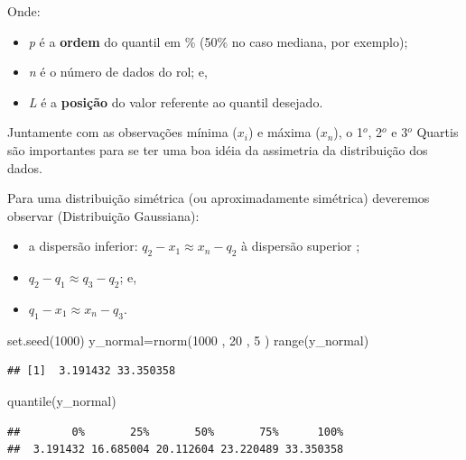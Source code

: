 \documentclass[
]{book}
\newenvironment{Shaded}{\begin{snugshade}}{\end{snugshade}}
\newcommand{\DecValTok}[1]{\textcolor[rgb]{0.00,0.00,0.81}{#1}}
\newcommand{\FunctionTok}[1]{\textcolor[rgb]{0.00,0.00,0.00}{#1}}
\newcommand{\NormalTok}[1]{#1}
\newcommand{\OtherTok}[1]{\textcolor[rgb]{0.56,0.35,0.01}{#1}}
\providecommand{\tightlist}{%
  \setlength{\itemsep}{0pt}\setlength{\parskip}{0pt}}
\begin{document}
Onde:

\begin{itemize}
\tightlist
\item
  \emph{p} é a \textbf{ordem} do quantil em \% (50\% no caso mediana, por exemplo);
\item
  \emph{n} é o número de dados do rol; e,
\item
  \emph{L} é a \textbf{posição} do valor referente ao quantil desejado.
\end{itemize}

Juntamente com as observações mínima (\(x_{i}\)) e máxima (\(x_{n}\)), o 1\(^{o}\), 2\(^{o}\) e 3\(^{o}\) Quartis são importantes para se ter uma boa idéia da assimetria da distribuição dos dados.

Para uma distribuição simétrica (ou aproximadamente simétrica) deveremos observar (Distribuição Gaussiana):

\begin{itemize}
\tightlist
\item
  a dispersão inferior: \(q_{2} - x_{1} \approx x_{n} - q_{2}\) à dispersão superior ;
\item
  \(q_{2} - q_{1} \approx q_{3} - q_{2}\); e,
\item
  \(q_{1} - x_{1} \approx x_{n} - q_{3}\).
\end{itemize}

\begin{Shaded}
\begin{Highlighting}[]
\FunctionTok{set.seed}\NormalTok{(}\DecValTok{1000}\NormalTok{)}
\NormalTok{y\_normal}\OtherTok{=}\FunctionTok{rnorm}\NormalTok{(}\DecValTok{1000}\NormalTok{ , }\DecValTok{20}\NormalTok{ , }\DecValTok{5}\NormalTok{ )}
\FunctionTok{range}\NormalTok{(y\_normal)}
\end{Highlighting}
\end{Shaded}

\begin{verbatim}
## [1]  3.191432 33.350358
\end{verbatim}

\begin{Shaded}
\begin{Highlighting}[]
\FunctionTok{quantile}\NormalTok{(y\_normal)}
\end{Highlighting}
\end{Shaded}

\begin{verbatim}
##        0%       25%       50%       75%      100% 
##  3.191432 16.685004 20.112604 23.220489 33.350358
\end{verbatim}
\end{document}
